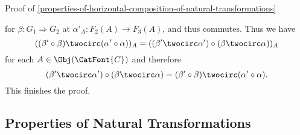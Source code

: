 \begin{Proof}{Proof of \cref{properties-of-horizontal-composition-of-natural-transformations}}
\begin{webcompile}
    \end{webcompile}
    for $\beta\colon G_{1}\Longrightarrow G_{2}$ at $\alpha'_{A}\colon F_{2}(A)\to F_{3}(A)$, and thus commutes. Thus we have
    \[
        ((\beta'\circ\beta)\twocirc(\alpha'\circ\alpha))_{A}
        =
        ((\beta'\twocirc\alpha')\circ(\beta\twocirc\alpha))_{A}
    \]%
    for each $A\in\Obj(\CatFont{C})$ and therefore
    \[
        (\beta'\twocirc\alpha')\circ(\beta\twocirc\alpha)%
        =%
        (\beta'\circ\beta)\twocirc(\alpha'\circ\alpha).%
    \]%
    This finishes the proof.
\end{Proof}
\subsection{Properties of Natural Transformations}\label{subsection-properties-of-natural-transformations}
